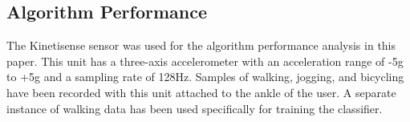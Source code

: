 \documentclass[journal]{IEEEtran}
\begin{document}
\subsection{Algorithm Performance}
%
The Kinetisense sensor was used for the algorithm performance analysis in this paper.
This unit has a three-axis accelerometer with an acceleration range of -5g to +5g and a sampling rate of 128Hz.
Samples of walking, jogging, and bicycling have been recorded with this unit attached to the ankle of the user.
A separate instance of walking data has been used specifically for training the classifier.
%
\begin{figure}[!ht]
  \centering
  \quad
  \centering
  \quad
  \centering

\end{figure}
\end{document}
